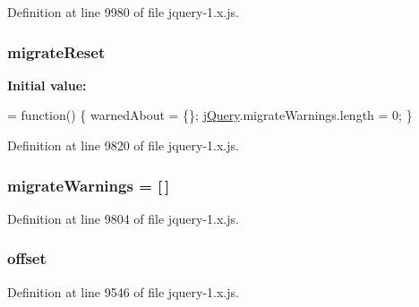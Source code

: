Definition at line 9980 of file jquery-\/1.\+x.\+js.

\subsubsection[{\texorpdfstring{migrate\+Reset}{migrateReset}}]{ migrate\+Reset}\hypertarget{jquery-1_8x_8js_ab96c0b87bc9c0be50a2ef9b9f4cb7728}{}\label{jquery-1_8x_8js_ab96c0b87bc9c0be50a2ef9b9f4cb7728}
{\bfseries Initial value\+:}
\begin{DoxyCode}
= \textcolor{keyword}{function}() \{
    warnedAbout = \{\};
    \hyperlink{jquery-1_8x_8js_a2b1d6f9c448e3ce72f4e1865d6e38d2c}{jQuery}.migrateWarnings.length = 0;
\}
\end{DoxyCode}


Definition at line 9820 of file jquery-\/1.\+x.\+js.

\subsubsection[{\texorpdfstring{migrate\+Warnings}{migrateWarnings}}]{ migrate\+Warnings = \mbox{[}$\,$\mbox{]}}\hypertarget{jquery-1_8x_8js_a2f5d54faf27c2755233472650b65ff03}{}\label{jquery-1_8x_8js_a2f5d54faf27c2755233472650b65ff03}


Definition at line 9804 of file jquery-\/1.\+x.\+js.

\subsubsection[{\texorpdfstring{offset}{offset}}]{ offset}\hypertarget{jquery-1_8x_8js_a4a9f594d20d927164551fc7fa4751a2f}{}\label{jquery-1_8x_8js_a4a9f594d20d927164551fc7fa4751a2f}


Definition at line 9546 of file jquery-\/1.\+x.\+js.

